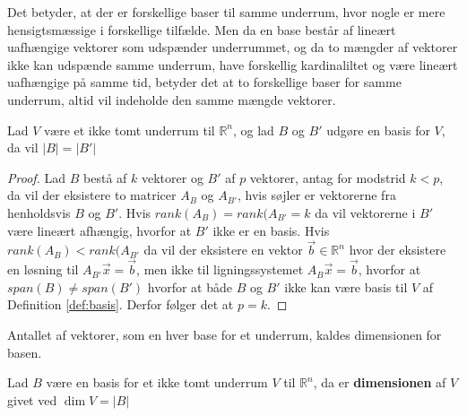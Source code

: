 Det betyder, at der er forskellige baser til samme underrum, hvor nogle er mere hensigtsmæssige i forskellige tilfælde.
Men da en base består af lineært uafhængige vektorer som udspænder underrummet, og da to mængder af vektorer ikke kan udspænde samme underrum, have forskellig kardinaliltet og være lineært uafhængige på samme tid, betyder det at to forskellige baser for samme underrum, altid vil indeholde den samme mængde vektorer.
\begin{stn}
Lad $V$ være et ikke tomt underrum til $\mathds{R}^n$, og lad $B$ og $B'$ udgøre en basis for $V$, da vil $|B|=|B'|$
\label{stn:basiskardinalitet}
\end{stn}
\begin{proof}
Lad $B$ bestå af $k$ vektorer og $B'$ af $p$ vektorer, antag for modstrid $k < p$, da vil der eksistere to matricer $A_{B}$ og $A_{B'}$, hvis søjler er vektorerne fra henholdsvis $B$ og $B'$.
Hvis $rank(A_{B}) = rank(A_{B'} = k$ da vil vektorerne i $B'$ være lineært afhængig, hvorfor at $B'$ ikke er en basis.
Hvis $rank(A_{B}) < rank(A_{B'} $ da vil der eksistere en vektor $\vec{b} \in \mathds{R}^n$ hvor der eksistere en løsning til $A_{B'}\vec{x} = \vec{b}$, men ikke til ligningssystemet $A_B \vec{x}=\vec{b}$, hvorfor at $span(B) \neq span(B')$ hvorfor at både $B$ og $B'$ ikke kan være basis til $V$ af Definition \ref{def:basis}.
Derfor følger det at $p=k$.
\end{proof}
Antallet af vektorer, som en hver base for et underrum, kaldes dimensionen for basen.
\begin{defn}[Dimension]
Lad $B$ være en basis for et ikke tomt underrum $V$ til $\mathds{R}^n$, da er \textbf{dimensionen} af $V$ givet ved $\dim{V} = |B|$
\label{def:dim}
\end{defn}







